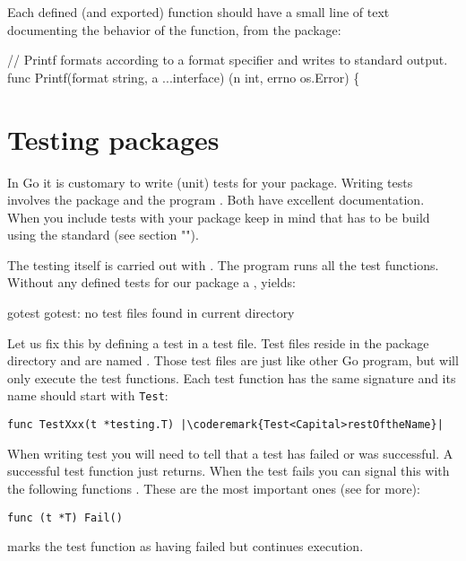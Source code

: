 Each defined (and exported) function should have a small line of text
documenting the behavior of the function, from the 
package:
\begin{display}
// Printf formats according to a format specifier and writes to standard output.
func Printf(format string, a ...interface{}) (n int, errno os.Error) \{
\end{display}

\section{Testing packages}
In Go it is customary to write (unit) tests for your package. Writing
tests involves the  package and the program
. Both
have excellent documentation. When you include tests with your package
keep in mind that has to be build using the standard 
(see section "").


The testing itself is carried out with .
The  program runs all the test functions. Without any
defined tests for our  package a , yields:
\begin{display}
\pr gotest
gotest: no test files found in current directory
\end{display}
Let us fix this by defining a test in a test file. Test files reside
in the package directory and are named . Those test
files are just like other Go program, but  will only
execute the test functions.
Each test function has the same signature and its name should start
with \lstinline{Test}:
\begin{lstlisting}
func TestXxx(t *testing.T) |\coderemark{Test<Capital>restOftheName}|
\end{lstlisting}

When writing test you will need to tell  that a test has
failed or was successful. A successful test function just returns. When
the test fails you can signal this with the following
functions \cite{go_doc}. These are the most important ones (see 
for more):

\begin{lstlisting}[numbers=none]
func (t *T) Fail()
\end{lstlisting}
 marks the test function as having failed but continues execution.

